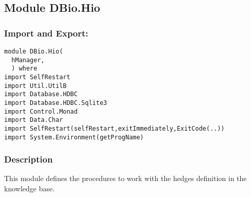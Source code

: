 \documentclass[../gr-final.tex]{subfiles}
\begin{document}
\subsection{Module DBio.Hio}
\subsubsection{Import and Export:}
\begin{lstlisting}
module DBio.Hio(
  hManager,
  ) where
import SelfRestart
import Util.UtilB
import Database.HDBC
import Database.HDBC.Sqlite3
import Control.Monad
import Data.Char
import SelfRestart(selfRestart,exitImmediately,ExitCode(..))
import System.Environment(getProgName)
\end{lstlisting}
\subsubsection{Description}
This module defines the procedures to work with the hedges
definition in the knowledge base. 
\end{document}
